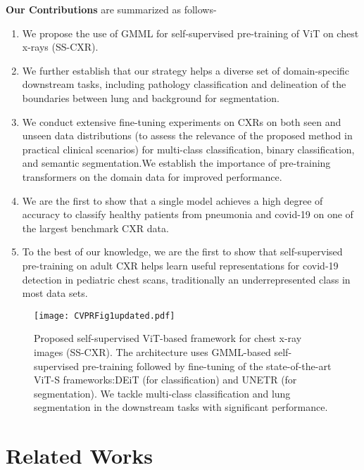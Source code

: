 \documentclass[10pt,journal,compsoc]{IEEEtran}
\begin{document}
\noindent \textbf{Our Contributions} are summarized as follows-
\begin{enumerate}
    \item We propose the use of GMML for self-supervised pre-training of ViT on chest x-rays (SS-CXR). 
    \item We further establish that our strategy helps a diverse set of domain-specific downstream tasks, including pathology classification and delineation of the boundaries between lung and background for segmentation.
    \item We conduct extensive fine-tuning experiments on CXRs on both seen and unseen data distributions (to assess the relevance of the proposed method in practical clinical scenarios) for multi-class classification, binary classification, and semantic segmentation.We establish the importance of pre-training transformers on the domain data for improved performance. \item We are the first to show that a single model achieves a high degree of accuracy to classify healthy patients from pneumonia and covid-19 on one of the largest benchmark CXR data.
    \item To the best of our knowledge, we are the first to show that self-supervised pre-training on adult CXR helps learn useful representations for covid-19 detection in pediatric chest scans, traditionally an underrepresented class in most data sets.   
\end{enumerate}

\begin{figure*}[ht]
    \centering
    \texttt{[image: CVPRFig1updated.pdf]}
    \caption{Proposed self-supervised ViT-based framework for chest x-ray images (SS-CXR). The architecture uses GMML-based self-supervised pre-training followed by fine-tuning of the state-of-the-art ViT-S frameworks:DEiT (for classification) and UNETR (for segmentation). We tackle multi-class classification and lung segmentation in the downstream tasks with significant performance.}
    \label{fig:GMMLtransformer}
\end{figure*}



\section{Related Works} 
\end{document}

